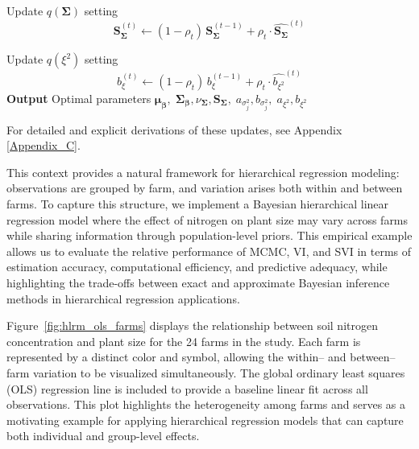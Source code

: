 \begin{algorithm}[H]
\begin{algorithmic}
  \State Update $q (\bm{\Sigma})$ setting
  $$
  \bm{S}_{\bm{\Sigma}}^{(t)} \leftarrow (1-\rho_t)\,\bm{S}_{\bm{\Sigma}}^{(t-1)} + \rho_t \cdot \hat{\bm{S}_{\bm{\bm{\Sigma}}}}^{(t)}
  $$
  
  \State Update $q (\xi^2)$ setting
  $$
  b_{\xi}^{(t)} \leftarrow (1-\rho_t)\,b_{\xi}^{(t-1)} + \rho_t \cdot \hat{b_{\xi^2}}^{(t)}
  $$
\EndFor
\State \textbf{Output} Optimal parameters $
\bm{\mu}_{\bm{\beta}},\; \bm{\Sigma}_{\bm{\beta}},\nu_{\bm{\Sigma}}, \bm{S}_{\bm{\Sigma}},\; a_{\sigma_j^2}, b_{\sigma_j^2},\; a_{\xi^2}, b_{\xi^2}$
\end{algorithmic}
\label{SVI_HLRM_alg}
\end{algorithm}

For detailed and explicit derivations of these updates, see Appendix \ref{Appendix_C}.

\newpage

This context provides a natural framework for hierarchical regression modeling: 
observations are grouped by farm, and variation arises both within and between farms. 
To capture this structure, we implement a Bayesian hierarchical linear regression 
model where the effect of nitrogen on plant size may vary across farms while 
sharing information through population-level priors. This empirical example allows us to evaluate the relative performance of MCMC, VI, 
and SVI in terms of estimation accuracy, computational efficiency, and predictive 
adequacy, while highlighting the trade-offs between exact and approximate Bayesian 
inference methods in hierarchical regression applications.

\vspace{0.5cm}

Figure~\ref{fig:hlrm_ols_farms} displays the relationship between soil nitrogen concentration and plant size for the 24 farms in the study. Each farm is represented by a distinct color and symbol, allowing the within– and between–farm variation to be visualized simultaneously. 
The global ordinary least squares (OLS) regression line is included to provide a baseline linear fit across all observations. 
This plot highlights the heterogeneity among farms and serves as a motivating example for applying hierarchical regression models that can capture both individual and group-level effects.

